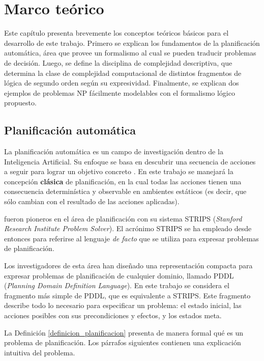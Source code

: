 \chapter{Marco teórico}
\label{Chapter1}

Este capítulo presenta brevemente los conceptos teóricos básicos para el
desarrollo de este trabajo. Primero se explican los fundamentos de la
planificación automática, área que provee un formalismo al cual se pueden
traducir problemas de decisión. Luego, se define la disciplina de complejidad
descriptiva, que determina la clase de complejidad computacional de distintos
fragmentos de lógica de segundo orden según su expresividad.
Finalmente, se explican dos ejemplos de problemas NP fácilmente modelables
con el formalismo lógico propuesto.

\section{Planificación automática}
La planificación automática es un campo de investigación dentro de la Inteligencia
Artificial. Su enfoque se basa en descubrir una secuencia de acciones a seguir para
lograr un objetivo concreto \citep{russell:book}. En este trabajo se manejará
la concepción \textbf{clásica} de planificación, en la cual todas las acciones
tienen una consecuencia determinística y observable en ambientes estáticos (es
decir, que sólo cambian con el resultado de las acciones aplicadas).

\cite{fikes:strips} fueron pioneros en el área de planificación con su sistema
STRIPS (\textit{Stanford Research
Institute Problem Solver}). El acrónimo STRIPS se ha empleado desde entonces
para referirse al lenguaje \textit{de facto} que se utiliza para expresar
problemas de planificación.

Los investigadores de esta área han diseñado una representación compacta para
expresar problemas de planificación de cualquier dominio, llamado PDDL
(\textit{Planning Domain Definition Language}).
En este trabajo se considera el fragmento más simple de PDDL, que es
equivalente a STRIPS.
Este fragmento describe todo lo necesario
para especificar un problema: el estado inicial, las acciones posibles con sus
precondiciones y efectos, y los estados meta.

La Definición \ref{definicion_planificacion} presenta de manera formal qué es
un problema de planificación. Los párrafos siguientes contienen una explicación
intuitiva del problema.

